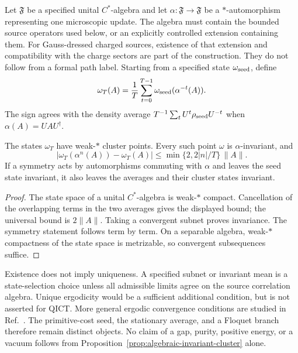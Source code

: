 Let $\mathfrak F$ be a specified unital $C^*$-algebra and let
$\alpha:\mathfrak F\to\mathfrak F$ be a $*$-automorphism representing one
microscopic update. The algebra must contain the bounded source operators
used below, or an explicitly controlled extension containing them. For
Gauss-dressed charged sources, existence of that extension and compatibility
with the charge sectors are part of the construction. They do not follow
from a formal path label. Starting from a specified state $\omega_{\rm seed}$,
define
\begin{equation}
 \omega_T(A)=\frac1T\sum_{t=0}^{T-1}
       \omega_{\rm seed}(\alpha^{-t}(A)).
 \label{eq:algebraic-cesaro-state}
\end{equation}
The sign agrees with the density average
$T^{-1}\sum_t U^t\rho_{\rm seed}U^{-t}$ when
$\alpha(A)=UAU^\dagger$.

\begin{proposition}
\label{prop:algebraic-invariant-cluster}
The states $\omega_T$ have weak-$*$ cluster points. Every such point $\omega$
is $\alpha$-invariant, and
\begin{equation}
 |\omega_T(\alpha^n(A))-\omega_T(A)|
 \leq\min\{2,2|n|/T\}\,\|A\|.
 \label{eq:algebraic-stationarity-bound}
\end{equation}
If a symmetry acts by automorphisms commuting with $\alpha$ and leaves the
seed state invariant, it also leaves the averages and their cluster states
invariant.
\end{proposition}
\begin{proof}
The state space of a unital $C^*$-algebra is weak-$*$ compact. Cancellation
of the overlapping terms in the two averages gives the displayed bound;
the universal bound is $2\|A\|$. Taking a convergent subnet proves
invariance. The symmetry statement follows term by term. On a separable
algebra, weak-$*$ compactness of the state space is metrizable, so convergent
subsequences suffice.
\end{proof}

Existence does not imply uniqueness. A specified subnet or invariant mean is
a state-selection choice unless all admissible limits agree on the source
correlation algebra. Unique ergodicity would be a sufficient additional
condition, but is not asserted for QICT. More general ergodic convergence
conditions are studied in Ref.~\cite{Fidaleo2020Ergodic}. The primitive-cost
seed, the stationary average, and a Floquet branch therefore remain distinct
objects. No claim of a gap, purity, positive energy, or a vacuum follows from
Proposition~\ref{prop:algebraic-invariant-cluster} alone.

